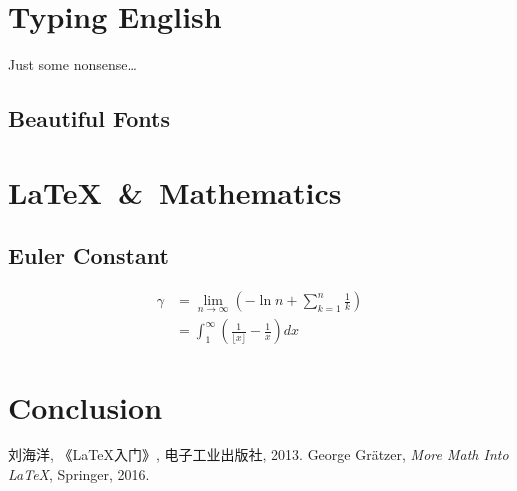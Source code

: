 \documentclass[UTF8,a4paper,twoside,zihao=-4]{ctexrep}
\begin{document}
\chapter{Typing English}
Just some nonsense\dots
\section{Beautiful Fonts}
\lipsum
\chapter{\LaTeX\ \&\ Mathematics}
\section{Euler Constant}
\[
\begin{aligned}
	\gamma&=\lim_{n\to\infty}\left(-\ln n+\sum_{k=1}^{n}\frac{1}{k}\right)\\
		   &=\int^{\infty}_{1}\left(\frac{1}{\lfloor x\rfloor}-\frac{1}{x}\right) dx
\end{aligned}
\]
\chapter{Conclusion}
\begin{thebibliography}{99}
	刘海洋, 《\LaTeX 入门》, 电子工业出版社, 2013.
	George Gr\"{a}tzer, \emph{More Math Into \LaTeX}, Springer, 2016.
\end{thebibliography}
\end{document}
